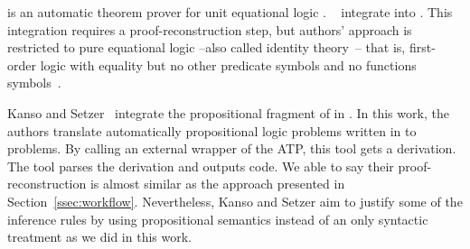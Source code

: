\documentclass[../main.tex]{subfiles}
\begin{document}


 is an automatic theorem prover for unit
equational logic \cite{hillenbrand1997}.
\citeauthor{foster2011integrating}~\cite{foster2011integrating}
integrate  into \Agda
\cite{agdateam}. This integration requires a proof-reconstruction
step, but authors' approach is restricted to pure equational logic
--also called identity theory~\cite{humberstone2011}-- that is,
first-order logic with equality but no other predicate symbols and
no functions symbols~\cite{appel1959}.

Kanso and Setzer~\cite{kanso2016light} integrate the propositional
fragment of  in \Agda. In this work, the authors
translate automatically propositional logic problems written in \Agda
to \TPTP problems. By calling an external wrapper of the ATP, this
tool gets a \TSTP derivation. The tool parses the 
derivation and outputs \Agda code.
We able to say their proof-reconstruction is almost
similar as the approach presented in Section~\ref{ssec:workflow}.
Nevertheless, Kanso and Setzer aim to justify some of the inference
rules by using propositional semantics instead of an only syntactic
treatment as we did in this work.
\end{document}
